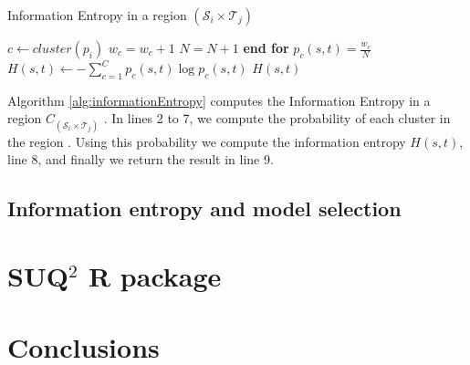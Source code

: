 \begin{algorithm} 
\caption{Information Entropy in a region $(\mathcal{S}_{i} \times \mathcal{T}_{j})$}\label{alg:informationEntropy}
\begin{algorithmic}[1] 
\State $c \gets cluster(p_i)$
\State $w_c= w_c+1$
\State $N=N+1$
\EndFor
\State \textbf{end for}
\State $p_{c}(s,t)= \frac{w_c}{N}$
\State $H(s, t) \gets -\sum_{c=1}^C p_{c}(s,t)\log p_{c}(s,t)$
\State \Return $H(s, t)$
\EndFunction 
\end{algorithmic} 
\end{algorithm} 


Algorithm \ref{alg:informationEntropy}  computes the Information Entropy in a region $C_{(\mathcal{S}_{i} \times \mathcal{T}_{j})}$ . In lines 2 to 7, we compute the probability of each cluster in the region . Using this probability we compute the information entropy $H(s, t)$, line 8, and finally we return the result in line 9.

\subsection{Information entropy and model selection}

\section{SUQ$^2$ R package}

\section{Conclusions}